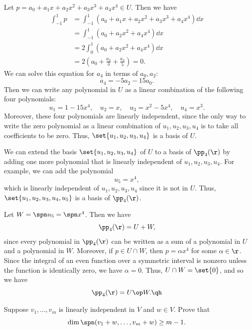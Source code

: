 \begin{sole}
    \item Let $p = a_0 + a_1 x + a_2 x^2 + a_3 x^3 + a_4 x^4 \in U$. Then we have
    \begin{align*}
        \int_{-1}^1 p & = \int_{-1}^1 (a_0 + a_1 x + a_2 x^2 + a_3 x^3 + a_4 x^4) \dd x \\
        & = \int_{-1}^1 (a_0 + a_2 x^2 + a_4 x^4) \dd x \\
        & = 2\int_0^1 (a_0 + a_2 x^2 + a_4 x^4) \dd x \\
        & = 2\left(a_0 + \frac{a_2}{3} + \frac{a_4}{5}\right) = 0.
    \end{align*}
    We can solve this equation for $a_4$ in terms of $a_0, a_2$:
    \[a_4 = -5a_2 - 15a_0.\]
    Then we can write any polynomial in $U$ as a linear combination of the following four polynomials:
    \[u_1 = 1 - 15x^4, \quad u_2 = x, \quad u_3 = x^2 - 5x^4, \quad u_4 = x^3.\]
    Moreover, these four polynomials are linearly independent, since the only way to write the zero polynomial as a linear combination of $u_1, u_2, u_3, u_4$ is to take all coefficients to be zero. Thus, $\set{u_1, u_2, u_3, u_4}$ is a basis of $U$.
    \item We can extend the basis $\set{u_1, u_2, u_3, u_4}$ of $U$ to a basis of $\pp_4(\r)$ by adding one more polynomial that is linearly independent of $u_1, u_2, u_3, u_4$. For example, we can add the polynomial
    \[u_5 = x^4,\]
    which is linearly independent of $u_1, u_2, u_3, u_4$ since it is not in $U$. Thus, $\set{u_1, u_2, u_3, u_4, u_5}$ is a basis of $\pp_4(\r)$.
    \item Let $W = \spn u_5 = \spn x^4$. Then we have
    \[\pp_4(\r) = U + W,\]
    since every polynomial in $\pp_4(\r)$ can be written as a sum of a polynomial in $U$ and a polynomial in $W$. Moreover, if $p \in U \cap W$, then $p = \alpha x^4$ for some $\alpha \in \r$. Since the integral of an even function over a symmetric interval is nonzero unless the function is identically zero, we have $\alpha = 0$. Thus, $U \cap W = \set{0}$, and so we have
    \[\pp_4(\r) = U \op W. \qh\]
\end{sole}

\begin{exercise}[2c8]
    Suppose $v_1, \ldots, v_m$ is linearly independent in $V$ and $w \in V$. Prove that
    \[\dim \spn(v_1 + w, \ldots, v_m + w) \geq m - 1.\]
\end{exercise}

